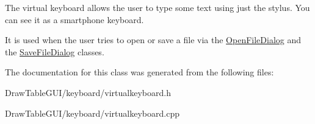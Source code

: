 The virtual keyboard allows the user to type some text using just the stylus. You can see it as a smartphone keyboard.

It is used when the user tries to open or save a file via the \hyperlink{classOpenFileDialog}{Open\+File\+Dialog} and the \hyperlink{classSaveFileDialog}{Save\+File\+Dialog} classes. 

The documentation for this class was generated from the following files\+:\begin{DoxyCompactItemize}
\item 
Draw\+Table\+G\+U\+I/keyboard/virtualkeyboard.\+h\item 
Draw\+Table\+G\+U\+I/keyboard/virtualkeyboard.\+cpp\end{DoxyCompactItemize}

